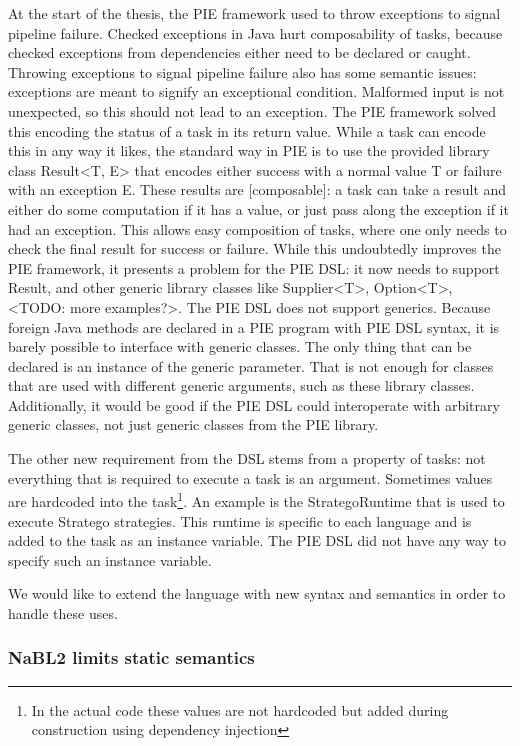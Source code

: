At the start of the thesis, the \ac{PIE} framework used to throw exceptions to signal pipeline failure.
Checked exceptions in Java hurt composability of tasks, because checked exceptions from dependencies either need to be declared or caught.
Throwing exceptions to signal pipeline failure also has some semantic issues: exceptions are meant to signify an exceptional condition.
Malformed input is not unexpected, so this should not lead to an exception.
The \ac{PIE} framework solved this encoding the status of a task in its return value.
While a task can encode this in any way it likes, the standard way in \ac{PIE} is to use the provided library class Result<T, E> that encodes either success with a normal value T or failure with an exception E.
These results are [composable]: a task can take a result and either do some computation if it has a value, or just pass along the exception if it had an exception.
This allows easy composition of tasks, where one only needs to check the final result for success or failure.
While this undoubtedly improves the \ac{PIE} framework, it presents a problem for the \ac{PIE} \ac{DSL}: it now needs to support Result, and other generic library classes like Supplier<T>, Option<T>, <TODO: more examples?>.
The \ac{PIE} \ac{DSL} does not support generics.
Because foreign Java methods are declared in a \ac{PIE} program with \ac{PIE} \ac{DSL} syntax, it is barely possible to interface with generic classes.
The only thing that can be declared is an instance of the generic parameter. That is not enough for classes that are used with different generic arguments, such as these library classes.
Additionally, it would be good if the \ac{PIE} \ac{DSL} could interoperate with arbitrary generic classes, not just generic classes from the \ac{PIE} library.

The other new requirement from the \ac{DSL} stems from a property of tasks: not everything that is required to execute a task is an argument.
Sometimes values are hardcoded into the task\footnote{In the actual code these values are not hardcoded but added during  construction using dependency injection}.
An example is the StrategoRuntime that is used to execute Stratego strategies.
This runtime is specific to each language and is added to the task as an instance variable.
The \ac{PIE} \ac{DSL} did not have any way to specify such an instance variable.

We would like to extend the language with new syntax and semantics in order to handle these uses.

\subsubsection{NaBL2 limits static semantics}
\label{subsubsec:problem_analysis__problems__nabl2}

